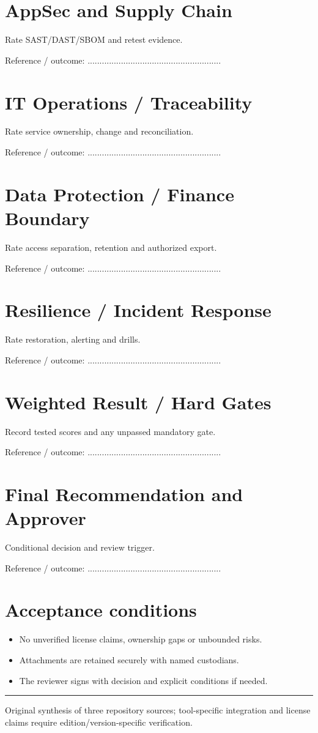 \documentclass[10pt,letterpaper]{article}
\begin{document}
\section{AppSec and Supply Chain}
Rate SAST/DAST/SBOM and retest evidence.\par
Reference / outcome: ........................................................\par
\section{IT Operations / Traceability}
Rate service ownership, change and reconciliation.\par
Reference / outcome: ........................................................\par
\section{Data Protection / Finance Boundary}
Rate access separation, retention and authorized export.\par
Reference / outcome: ........................................................\par
\section{Resilience / Incident Response}
Rate restoration, alerting and drills.\par
Reference / outcome: ........................................................\par
\section{Weighted Result / Hard Gates}
Record tested scores and any unpassed mandatory gate.\par
Reference / outcome: ........................................................\par
\section{Final Recommendation and Approver}
Conditional decision and review trigger.\par
Reference / outcome: ........................................................\par
\section{Acceptance conditions}
\begin{itemize}
\item No unverified license claims, ownership gaps or unbounded risks.
\item Attachments are retained securely with named custodians.
\item The reviewer signs with decision and explicit conditions if needed.
\end{itemize}
\vfill\noindent\color{muted}\rule{\linewidth}{0.4pt}\par\scriptsize Original synthesis of three repository sources; tool-specific integration and license claims require edition/version-specific verification.\normalsize
\end{document}
